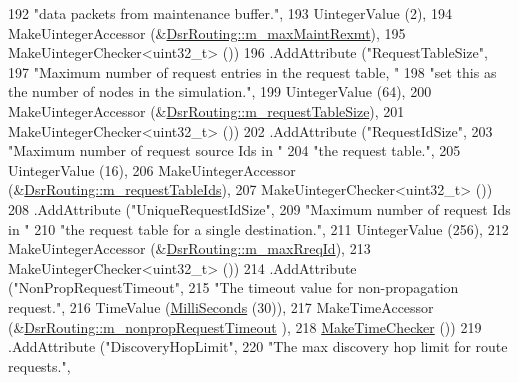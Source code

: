 \begin{DoxyCode}
192                    \textcolor{stringliteral}{"data packets from maintenance buffer."},
193                    UintegerValue (2),
194                    MakeUintegerAccessor (&\hyperlink{classns3_1_1dsr_1_1DsrRouting_aca44a3d45b57be61ec3e41774f20c1fb}{DsrRouting::m\_maxMaintRexmt}),
195                    MakeUintegerChecker<uint32\_t> ())
196     .AddAttribute (\textcolor{stringliteral}{"RequestTableSize"},
197                    \textcolor{stringliteral}{"Maximum number of request entries in the request table, "}
198                    \textcolor{stringliteral}{"set this as the number of nodes in the simulation."},
199                    UintegerValue (64),
200                    MakeUintegerAccessor (&\hyperlink{classns3_1_1dsr_1_1DsrRouting_a8f6df12e2c9690f79943c2195af1be37}{DsrRouting::m\_requestTableSize}),
201                    MakeUintegerChecker<uint32\_t> ())
202     .AddAttribute (\textcolor{stringliteral}{"RequestIdSize"},
203                    \textcolor{stringliteral}{"Maximum number of request source Ids in "}
204                    \textcolor{stringliteral}{"the request table."},
205                    UintegerValue (16),
206                    MakeUintegerAccessor (&\hyperlink{classns3_1_1dsr_1_1DsrRouting_aac8b18967bf0bc05a7f0024ea55e99b1}{DsrRouting::m\_requestTableIds}),
207                    MakeUintegerChecker<uint32\_t> ())
208     .AddAttribute (\textcolor{stringliteral}{"UniqueRequestIdSize"},
209                    \textcolor{stringliteral}{"Maximum number of request Ids in "}
210                    \textcolor{stringliteral}{"the request table for a single destination."},
211                    UintegerValue (256),
212                    MakeUintegerAccessor (&\hyperlink{classns3_1_1dsr_1_1DsrRouting_a14ef1332178e76768359c27a45db9624}{DsrRouting::m\_maxRreqId}),
213                    MakeUintegerChecker<uint32\_t> ())
214     .AddAttribute (\textcolor{stringliteral}{"NonPropRequestTimeout"},
215                    \textcolor{stringliteral}{"The timeout value for non-propagation request."},
216                    TimeValue (\hyperlink{group__timecivil_gaf26127cf4571146b83a92ee18679c7a9}{MilliSeconds} (30)),
217                    MakeTimeAccessor (&\hyperlink{classns3_1_1dsr_1_1DsrRouting_a42c2f43fbb0c5fefed36689eaf5c720e}{DsrRouting::m\_nonpropRequestTimeout}
      ),
218                    \hyperlink{group__time_ga7032965bd4afa578691d88c09e4481c1}{MakeTimeChecker} ())
219     .AddAttribute (\textcolor{stringliteral}{"DiscoveryHopLimit"},
220                    \textcolor{stringliteral}{"The max discovery hop limit for route requests."},

\end{DoxyCode}
